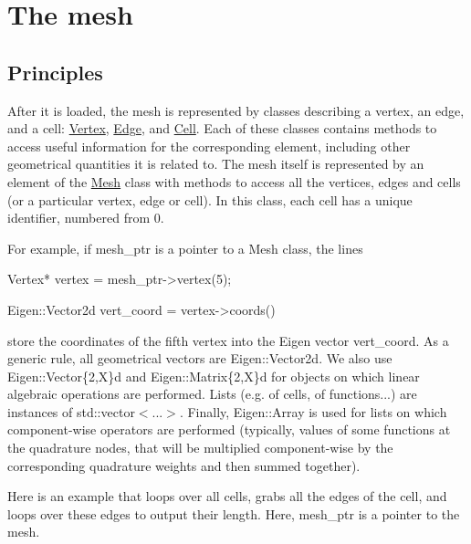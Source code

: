 \label{_mesh}%
 \hypertarget{index_mesh}{}\section{The mesh}\label{index_mesh}
\hypertarget{index_meshpple}{}\subsection{Principles}\label{index_meshpple}
After it is loaded, the mesh is represented by classes describing a vertex, an edge, and a cell\+: \hyperlink{classHArDCore2D_1_1Vertex}{Vertex}, \hyperlink{classHArDCore2D_1_1Edge}{Edge}, and \hyperlink{classHArDCore2D_1_1Cell}{Cell}. Each of these classes contains methods to access useful information for the corresponding element, including other geometrical quantities it is related to. The mesh itself is represented by an element of the \hyperlink{classHArDCore2D_1_1Mesh}{Mesh} class with methods to access all the vertices, edges and cells (or a particular vertex, edge or cell). In this class, each cell has a unique identifier, numbered from 0.

For example, if {\ttfamily mesh\+\_\+ptr} is a pointer to a Mesh class, the lines 
\begin{DoxyCode}
Vertex* vertex = mesh\_ptr->vertex(5);

Eigen::Vector2d vert\_coord = vertex->coords()
\end{DoxyCode}
 store the coordinates of the fifth vertex into the Eigen vector vert\+\_\+coord. As a generic rule, all geometrical vectors are {\ttfamily Eigen\+::\+Vector2d}. We also use {\ttfamily Eigen\+::\+Vector\{2,X\}d} and {\ttfamily Eigen\+::\+Matrix\{2,X\}d} for objects on which linear algebraic operations are performed. Lists (e.\+g. of cells, of functions...) are instances of {\ttfamily std\+::vector$<$...$>$}. Finally, {\ttfamily Eigen\+::\+Array} is used for lists on which component-\/wise operators are performed (typically, values of some functions at the quadrature nodes, that will be multiplied component-\/wise by the corresponding quadrature weights and then summed together).

Here is an example that loops over all cells, grabs all the edges of the cell, and loops over these edges to output their length. Here, {\ttfamily mesh\+\_\+ptr} is a pointer to the mesh.


